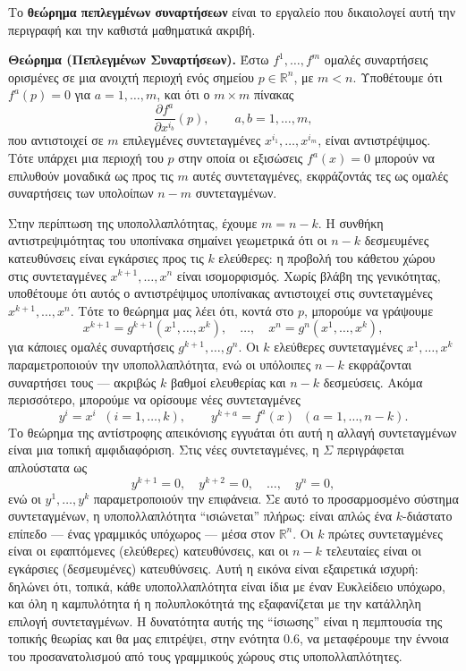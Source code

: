 \documentclass[11pt,a4paper,twoside,openright]{book}
\begin{document}
Το \textbf{θεώρημα πεπλεγμένων συναρτήσεων} είναι το εργαλείο που δικαιολογεί αυτή την περιγραφή και την καθιστά μαθηματικά ακριβή.

\textbf{Θεώρημα (Πεπλεγμένων Συναρτήσεων).} Έστω $f^1, \dots, f^{m}$ ομαλές συναρτήσεις ορισμένες σε μια ανοιχτή περιοχή ενός σημείου $p \in \mathbb{R}^n$, με $m < n$. Υποθέτουμε ότι $f^a(p) = 0$ για $a = 1, \dots, m$, και ότι ο $m \times m$ πίνακας
\[
\frac{\partial f^a}{\partial x^{i_b}}(p), \qquad a, b = 1, \dots, m,
\]
που αντιστοιχεί σε $m$ επιλεγμένες συντεταγμένες $x^{i_1}, \dots, x^{i_m}$, είναι αντιστρέψιμος. Τότε υπάρχει μια περιοχή του $p$ στην οποία οι εξισώσεις $f^a(x) = 0$ μπορούν να επιλυθούν μοναδικά ως προς τις $m$ αυτές συντεταγμένες, εκφράζοντάς τες ως ομαλές συναρτήσεις των υπολοίπων $n-m$ συντεταγμένων.

Στην περίπτωση της υποπολλαπλότητας, έχουμε $m = n-k$. Η συνθήκη αντιστρεψιμότητας του υποπίνακα σημαίνει γεωμετρικά ότι οι $n-k$ δεσμευμένες κατευθύνσεις είναι εγκάρσιες προς τις $k$ ελεύθερες: η προβολή του κάθετου χώρου στις συντεταγμένες $x^{k+1}, \dots, x^n$ είναι ισομορφισμός. Χωρίς βλάβη της γενικότητας, υποθέτουμε ότι αυτός ο αντιστρέψιμος υποπίνακας αντιστοιχεί στις συντεταγμένες $x^{k+1}, \dots, x^n$. Τότε το θεώρημα μας λέει ότι, κοντά στο $p$, μπορούμε να γράψουμε
\[
x^{k+1} = g^{k+1}(x^1, \dots, x^k), \quad \dots, \quad x^n = g^n(x^1, \dots, x^k),
\]
για κάποιες ομαλές συναρτήσεις $g^{k+1}, \dots, g^n$. Οι $k$ ελεύθερες συντεταγμένες $x^1, \dots, x^k$ παραμετροποιούν την υποπολλαπλότητα, ενώ οι υπόλοιπες $n-k$ εκφράζονται συναρτήσει τους --- ακριβώς $k$ βαθμοί ελευθερίας και $n-k$ δεσμεύσεις. Ακόμα περισσότερο, μπορούμε να ορίσουμε νέες συντεταγμένες
\[
y^i = x^i \;\; (i = 1, \dots, k), \qquad y^{k+a} = f^a(x) \;\; (a = 1, \dots, n-k).
\]
Το θεώρημα της αντίστροφης απεικόνισης εγγυάται ότι αυτή η αλλαγή συντεταγμένων είναι μια τοπική αμφιδιαφόριση. Στις νέες συντεταγμένες, η $\Sigma$ περιγράφεται απλούστατα ως
\[
y^{k+1} = 0, \quad y^{k+2} = 0, \quad \dots, \quad y^n = 0,
\]
ενώ οι $y^1, \dots, y^k$ παραμετροποιούν την επιφάνεια. Σε αυτό το προσαρμοσμένο σύστημα συντεταγμένων, η υποπολλαπλότητα ``ισιώνεται'' πλήρως: είναι απλώς ένα $k$-διάστατο επίπεδο --- ένας γραμμικός υπόχωρος --- μέσα στον $\mathbb{R}^n$. Οι $k$ πρώτες συντεταγμένες είναι οι εφαπτόμενες (ελεύθερες) κατευθύνσεις, και οι $n-k$ τελευταίες είναι οι εγκάρσιες (δεσμευμένες) κατευθύνσεις. Αυτή η εικόνα είναι εξαιρετικά ισχυρή: δηλώνει ότι, τοπικά, κάθε υποπολλαπλότητα είναι ίδια με έναν Ευκλείδειο υπόχωρο, και όλη η καμπυλότητα ή η πολυπλοκότητά της εξαφανίζεται με την κατάλληλη επιλογή συντεταγμένων. Η δυνατότητα αυτής της ``ίσιωσης'' είναι η πεμπτουσία της τοπικής θεωρίας και θα μας επιτρέψει, στην ενότητα 0.6, να μεταφέρουμε την έννοια του προσανατολισμού από τους γραμμικούς χώρους στις υποπολλαπλότητες.
\end{document}
